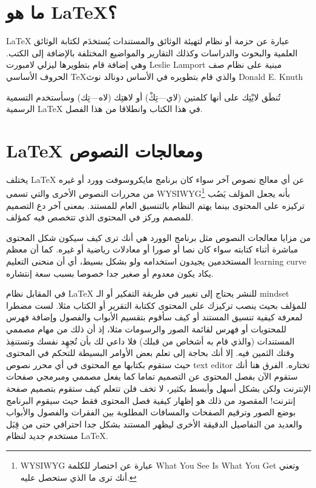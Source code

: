 \documentclass[12pt,a4paper,onecolumn,notitlepage]{book}
\begin{document}
\section{ما هو \textenglish{\LaTeX}؟} %
\label{sec:ما_هو_latex_}
\textenglish{\LaTeX} عبارة عن حزمة أو نظام لتهيئة الوثائق والمستندات يُستخدَم لكتابة الوثائق العلمية والبحوث والدراسات وكذلك التقارير والمواضيع المختلفة بالإضافة إلى الكتب. وهي إضافة قام بتطويرها ليزلي لامبورت \textenglish{Leslie Lamport} مبنية على نظام صف الحروف الأساسي \TeX والذي قام بتطويره في الأساس دونالد نوث \textenglish{Donald E. Knuth}

تُنطَق لايْتِك على أنها كلمتين (لاي---تِكْ) أو لاهتِك (لاه---تِك) وسأستخدم التسمية الرسمية \textenglish{\LaTeX} في هذا الكتاب وانطلاقا من هذا الفصل.
\section{\textenglish{\LaTeX} ومعالجات النصوص} %
\label{sec:latex_ومعالجات_النصوص}
يختلف \textenglish{\LaTeX} عن أي معالج نصوص آخر سواء كان برنامج مايكروسوفت وورد أو غيره من محررات النصوص الأخرى والتي تسمى \textenglish{WYSIWYG}\footnote{WYSIWYG عبارة عن اختصار للكلمة \textenglish{What You See Is What You Get} وتعني أنك ترى ما الذي ستحصل عليه.} بأنه يجعل المؤلف يَصُب تركيزه على المحتوى بينما يهتم النظام بالتنسيق العام للمستند. بمعنى آخر دع التصميم للمصمم وركز في المحتوى الذي تتخصص فيه كمؤلف.

\noindent من مزايا معالجات النصوص مثل برنامج الوورد هي أنك ترى كيف سيكون شكل المحتوى مباشرة أثناء كتابته سواء كان نصا أو صورا أو معادلات رياضية أو غيره. كما أن معظم المستخدمين يجيدون استخدامه ولو بشكل بسيط، أي أن منحنى التعليم \textenglish{learning curve} يكاد يكون معدوم أو صغير جدا خصوصا بسبب سعة إنتشاره.

\noindent في المقابل نظام \textenglish{\LaTeX} للنشر يحتاج إلى تغيير في طريقة التفكير أو الـ \textenglish{mindset} للمؤلف بحيث ينصب تركيزك على المحتوى ككتابة التقرير أو الكتاب مثلا. لست مضطرا لمعرفة كيفية تنسيق المستند أو كيف سأقوم بتقسيم الأبواب والفصول وإضافة فهرس للمحتويات أو فهرس لقائمة الصور والرسومات مثلا، إذ أن ذلك من مهام مصممي المستندات (والذي قام به أشخاص من قبلك) فلا داعي لك بأن تُجهِد نفسك وتستنفِذ وقتك الثمين فيه. إلا أنك بحاجة إلى تعلم بعض الأوامر البسيطة للتحكم في المحتوى حيث ستقوم بكتابها مع المحتوى في أي محرر نصوص \textenglish{text editor} تختاره. الفرق هنا أنك ستقوم الآن بفصل المحتوى عن التصميم تماما كما يفعل مصممي ومبرمجي صفحات الإنترنت ولكن بشكل أسهل وأبسط بكثير، لا تخف فلن تتعلم كيف ستقوم بتصميم صفحة إنترنت! المقصود من ذلك هو إظهار كيفية فصل المحتوى فقط حيث سيقوم البرنامج بوضع الصور وترقيم الصفحات والمسافات المطلوبة بين الفقرات والفصول والأبواب والعديد من التفاصيل الدقيقة الأخرى ليظهر المستند بشكل جدا احترافي حتى من قِبَل مستخدم جديد لنظام \textenglish{\LaTeX}.
\end{document}
